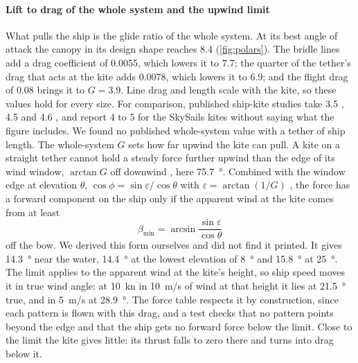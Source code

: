 \paragraph{Lift to drag of the whole system and the upwind limit} What pulls the ship is the glide ratio of the whole system. At its best angle of attack the canopy in its design shape reaches 8.4 (\cref{fig:polars}). The bridle lines add a drag coefficient of 0.0055, which lowers it to 7.7; the quarter of the tether's drag that acts at the kite adds 0.0078, which lowers it to 6.9; and the flight drag of 0.08 brings it to $G=3.9$. Line drag and length scale with the kite, so these values hold for every size. For comparison, published ship-kite studies take 3.5 \citep{traut2014}, 4.5 \citep{cedelft2016} and 4.6 \citep{podeur2016}, and \citet{erhard2013} report 4 to 5 for the SkySails kites without saying what the figure includes. We found no published whole-system value with a tether of ship length. The whole-system $G$ sets how far upwind the kite can pull. A kite on a straight tether cannot hold a steady force further upwind than the edge of its wind window, $\arctan G$ off downwind \citep{erhard2013}, here \SI{75.7}{\degree}. Combined with the window edge at elevation $\theta$, $\cos\phi=\sin\varepsilon/\cos\theta$ with $\varepsilon=\arctan(1/G)$ \citep{bigi2018}, the force has a forward component on the ship only if the apparent wind at the kite comes from at least
\begin{equation}
\beta_\mathrm{min}=\arcsin\frac{\sin\varepsilon}{\cos\theta}
\label{eq:upwind_limit}
\end{equation}
off the bow. We derived this form ourselves and did not find it printed. It gives \SI{14.3}{\degree} near the water, \SI{14.4}{\degree} at the lowest elevation of \SI{8}{\degree} and \SI{15.8}{\degree} at \SI{25}{\degree}. The limit applies to the apparent wind at the kite's height, so ship speed moves it in true wind angle: at \SI{10}{kn} in \SI{10}{m/s} of wind at that height it lies at \SI{21.5}{\degree} true, and in \SI{5}{m/s} at \SI{28.9}{\degree}. The force table respects it by construction, since each pattern is flown with this drag, and a test checks that no pattern points beyond the edge and that the ship gets no forward force below the limit. Close to the limit the kite gives little: its thrust falls to zero there and turns into drag below it.


